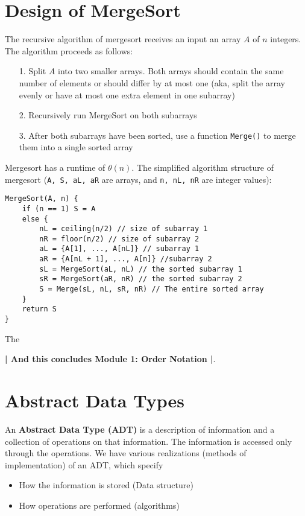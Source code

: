 \documentclass{report}
\begin{document}
\section{Design of MergeSort}
The recursive algorithm of mergesort receives an input an array $A$ of $n$ integers. The algorithm proceeds as follows:
\begin{itemize}
\item[1.] Split $A$ into two smaller arrays. Both arrays should contain the same number of elements or should differ by at most one (aka, split the array evenly or have at most one extra element in one subarray)
\item[2.] Recursively run MergeSort on both subarrays
\item[3.] After both subarrays have been sorted, use a function \texttt{Merge()} to merge them into a single sorted array
\end{itemize}
Mergesort has a runtime of $\theta(n)$.
The simplified algorithm structure of mergesort (\texttt{A, S, aL, aR} are arrays, and \texttt{n, nL, nR} are integer values):
\begin{lstlisting}
MergeSort(A, n) {
	if (n == 1) S = A
	else {
		nL = ceiling(n/2) // size of subarray 1
		nR = floor(n/2) // size of subarray 2
		aL = {A[1], ..., A[nL]} // subarray 1
		aR = {A[nL + 1], ..., A[n]} //subarray 2
		sL = MergeSort(aL, nL) // the sorted subarray 1
		sR = MergeSort(aR, nR) // the sorted subarray 2
		S = Merge(sL, nL, sR, nR) // The entire sorted array
	}
	return S
}
\end{lstlisting}
The 
\begin{center}
\textbf{| And this concludes Module 1: Order Notation |}.
\end{center} \newpage

\section{Abstract Data Types}
An \textbf{Abstract Data Type (ADT)} is a description of information and a collection of operations on that information. The information is accessed only through the operations. We have various realizations (methods of implementation) of an ADT, which specify 
\begin{itemize}
\item How the information is stored (Data structure)
\item How operations are performed (algorithms)
\end{itemize}
\end{document}
